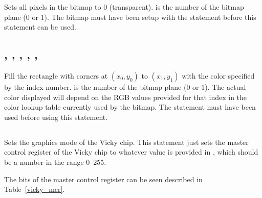\documentclass{report}
\begin{document}
    Sets all pixels in the bitmap to 0 (transparent).
     is the number of the bitmap plane (0 or 1).
    The bitmap must have been setup with the  statement before
    this statement can be used.

    \subsection*{ , , , , , }

    Fill the rectangle with corners at $(x_0, y_0)$ to $(x_1, y_1)$ with the color
    specified by the  index number.
     is the number of the bitmap plane (0 or 1).
    The actual color displayed will depend on the RGB values provided for
    that index in the color lookup table currently used by the bitmap.
    The  statement must have been used before using
    this statement.

    \subsection*{ }

    Sets the graphics mode of the Vicky chip.
    This statement just sets the master control register of the Vicky chip to
    whatever value is provided in , which should be a number in the range 0--255.

    The bits of the master control register can be seen described in Table~\ref{vicky_mcr}.
\end{document}
